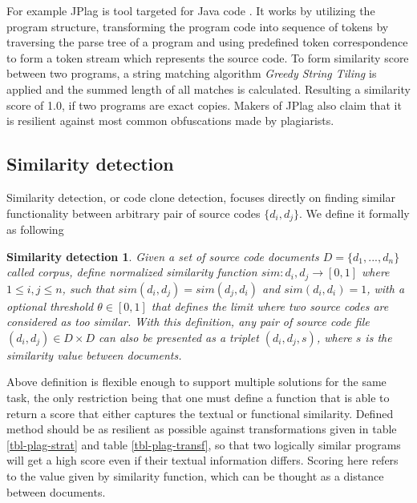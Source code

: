 For example JPlag is tool targeted for Java code \cite{prechelt2002finding}. It works by utilizing the program structure, transforming the program code into sequence of tokens by traversing the parse tree of a program and using predefined token correspondence to form a token stream which represents the source code. To form similarity score between two programs, a string matching algorithm \emph{Greedy String Tiling} \cite{SSGST1993} is applied and the summed length of all matches is calculated. Resulting a similarity score of 1.0, if two programs are exact copies. Makers of JPlag also claim that it is resilient against most common obfuscations made by plagiarists. 

\subsection{Similarity detection} \label{chap-sd}

Similarity detection, or code clone detection, focuses directly on finding similar functionality between arbitrary pair of source codes $\{d_i, d_j\}$. We define it formally as following

\newtheorem*{smd1}{Similarity detection}

\begin{smd1}
Given a set of source code documents $D = \{d_1,...,d_n\}$ called corpus, define normalized similarity function $sim: d_i, d_j \rightarrow [0, 1]$ where $1 \leq i, j \leq n$, such that $sim(d_i, d_j) = sim(d_j, d_i)$ and $sim(d_i, d_i) = 1$, with a optional threshold $\theta \in [0, 1]$ that defines the limit where two source codes are considered as too similar. With this definition, any pair of source code file $(d_i, d_j) \in D \times D$ can also be presented as a triplet $(d_i, d_j, s)$, where $s$ is the similarity value between documents. 
\end{smd1}

\noindent
Above definition is flexible enough to support multiple solutions for the same task, the only restriction being that one must define a function that is able to return a score that either captures the textual or functional similarity. Defined method should be as resilient as possible against transformations given in table \ref{tbl-plag-strat} and table \ref{tbl-plag-transf}, so that two logically similar programs will get a high score even if their textual information differs. Scoring here refers to the value given by similarity function, which can be thought as a distance between documents.

